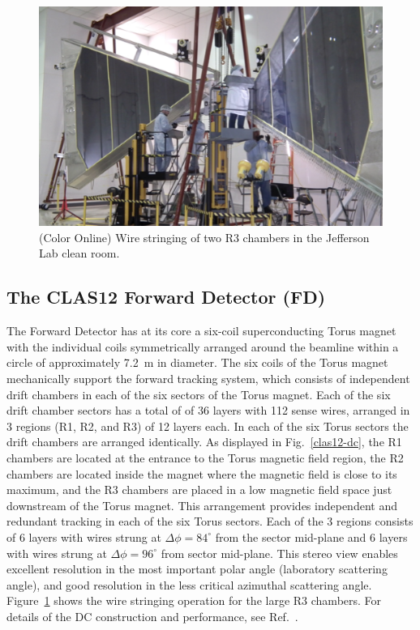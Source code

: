 \documentclass[final,3p,twocolumn]{elsarticle}
\begin{document}
\begin{figure}[htbp!]
\centerline{\includegraphics[width=1.65\columnwidth]{DC-R3.png}}
\caption{(Color Online) Wire stringing of two R3 chambers in the Jefferson Lab clean room.}
\label{dc-stringing}
\end{figure}

\subsection{The CLAS12 Forward Detector (FD)}

The Forward Detector has at its core a six-coil superconducting Torus magnet with the individual coils
symmetrically arranged around the beamline within a circle of approximately 7.2~m in diameter. The six coils of the
Torus magnet mechanically support the forward tracking system, which consists of independent drift chambers in
each of the six sectors of the Torus magnet. Each of the six drift chamber sectors has a total of of 36 layers with
112 sense wires, arranged in 3 regions (R1, R2, and R3) of 12 layers each. In each of the six Torus sectors the drift
chambers are arranged identically. As displayed in Fig.~\ref{clas12-dc}, the R1 chambers are located at the entrance
to the Torus magnetic field region, the R2 chambers are located inside the magnet where the magnetic field is close
to its maximum, and the R3 chambers are placed in a low magnetic field space just downstream of the Torus magnet.
This arrangement provides independent and redundant tracking in each of the six Torus sectors. Each of the 3 regions
consists of 6 layers with wires strung at $\Delta{\phi} = 84^\circ$ from the sector mid-plane and 6 layers with wires
strung at $\Delta{\phi} = 96^\circ$ from sector mid-plane. This stereo view enables excellent resolution in the most
important polar angle (laboratory scattering angle), and good resolution in the less critical azimuthal scattering angle.
Figure~\ref{dc-stringing} shows the wire stringing operation for the large R3 chambers. For details of the DC
construction and performance, see Ref.~\cite{DC}.
\end{document}
